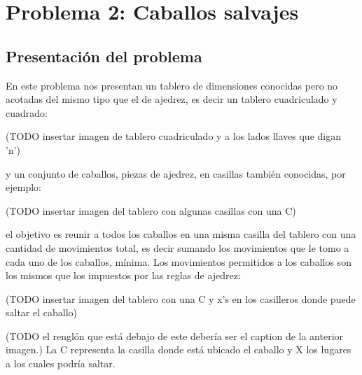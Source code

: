 \section{Problema 2: Caballos salvajes}

\subsection{Presentación del problema}
En este problema nos presentan un tablero de dimensiones conocidas pero no acotadas
del mismo tipo que el de ajedrez, es decir un tablero cuadriculado y cuadrado:\\
\begin{center}
(TODO insertar imagen de tablero cuadriculado y a los lados llaves que digan 'n')
\end{center}
y un conjunto de caballos, piezas de ajedrez, en casillas también conocidas, por ejemplo:\\
\begin{center}
(TODO insertar imagen del tablero con algunas casillas con una C)
\end{center}
el objetivo es reunir a todos los caballos en una misma casilla del tablero con una cantidad
de movimientos total, es decir sumando los movimientos que le tomo a cada uno de los caballos, mínima.
Los movimientos permitidos a los caballos son los mismos que los impuestos por las reglas de ajedrez:\\
\begin{center}
(TODO insertar imagen del tablero con una C y x's en los casilleros donde puede saltar el caballo)
\end{center}
(TODO el renglón que está debajo de este debería ser el caption de la anterior imagen.)
La C representa la casilla donde está ubicado el caballo y X los lugares a los cuales podría saltar.

